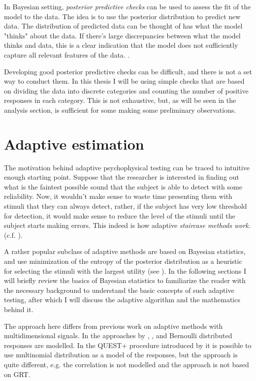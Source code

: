 \documentclass{article}\usepackage{knitr}
\begin{document}
In Bayesian setting, \textit{posterior predictive checks} can be used to assess the fit of the model to the data. The idea is to use the posterior distribution to predict new data. The distribution of predicted data can be thought of has what the model "thinks" about the data. If there's large discrepancies between what the model thinks and data, this is a clear indication that the model does not sufficiently capture all relevant features of the data. \citep[Chapter 7]{bda}.

Developing good posterior predictive checks can be difficult, and there is not a set way to conduct them. In this thesis I will be using simple checks that are based on dividing the data into discrete categories and counting the number of positive responses in each category. This is not exhaustive, but, as will be seen in the analysis section, is sufficient for some making some preliminary observations. 


\newpage


\section{Adaptive estimation}
\label{sec:adaptive}

The motivation behind adaptive psychophysical testing can be traced to intuitive enough starting point. Suppose that the researcher is interested in finding out what is the faintest possible sound that the subject is able to detect with some reliability. Now, it wouldn't make sense to waste time presenting them with stimuli that they can always detect, rather, if the subject has very low threshold for detection, it would make sense to reduce the level of the stimuli until the subject starts making errors. This indeed is how adaptive \textit{staircase methods work}. (c.f. \citet[Chapter 5]{kingdomprins2010}).

A rather popular subclass of adaptive methods are based on Bayesian statistics, and use minimization of the entropy of the posterior distribution as a heuristic for selecting the stimuli with the largest utility (see \citet{kontsevichtyler1999}). In the following sections I will briefly review the basics of Bayesian statistics to familiarize the reader with the necessary background to understand the basic concepts of such adaptive testing, after which I will discuss the adaptive algorithm and the mathematics behind it.

The approach here differs from previous work on adaptive methods with multidimensional signals. In the approaches by \citet{dimattina2015}, \citet{lesmes2006}, \citet{shen2013, shen2014} and \citet{kujalalukka2006} Bernoulli distributed responses are modelled. In the QUEST+ procedure introduced by \citet{watson2017} it is possible to use multinomial distribution as a model of the responses, but the approach is quite different, e.g. the correlation is not modelled and the approach is not based on GRT.
\end{document}

